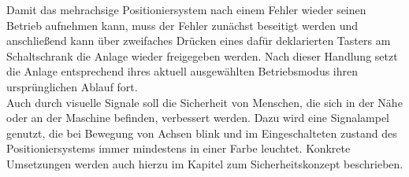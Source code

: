 \documentclass[../Bachelorarbeit.tex]{subfiles}
\begin{document}
Damit das mehrachsige Positioniersystem nach einem Fehler wieder seinen Betrieb aufnehmen kann, muss der Fehler zunächst beseitigt werden und anschließend kann über zweifaches Drücken eines dafür deklarierten Tasters am Schaltschrank die Anlage wieder freigegeben werden. Nach dieser Handlung setzt die Anlage entsprechend ihres aktuell ausgewählten Betriebsmodus ihren ursprünglichen Ablauf fort.\\
Auch durch visuelle Signale soll die Sicherheit von Menschen, die sich in der Nähe oder an der Maschine befinden, verbessert werden. Dazu wird eine Signalampel genutzt, die bei Bewegung von Achsen blink und im Eingeschalteten zustand des Positioniersystems immer mindestens in einer Farbe leuchtet. Konkrete Umsetzungen werden auch hierzu im Kapitel zum Sicherheitskonzept beschrieben.
\end{document}
